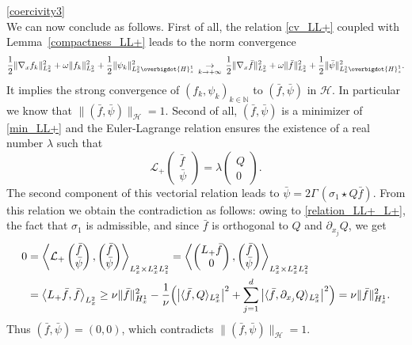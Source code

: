 \begin{ProofOf}{\eqref{coercivity3}}
\begin{equation}
\end{equation}
We can now conclude as follows. First of all, the relation \eqref{cv_LL+} coupled with Lemma~\ref{compactness_LL+} leads to the norm convergence
\[
\frac{1}{2}\|\nabla_{x}f_{k}\|_{L_{x}^{2}}^{2}+\omega\|f_{k}\|_{L_{x}^{2}}^{2}+\frac{1}{2}\|\psi_{k}\|_{L_{x}^{2}\overbigdot{H}_{z}^{1}}^{2}\,\underset{k\to +\infty}{\to}\,\frac{1}{2}\|\nabla_{x}\bar{f}\|_{L_{x}^{2}}^{2}+\omega\|\bar{f}\|_{L_{x}^{2}}^{2}+\frac{1}{2}\|\bar{\psi}\|_{L_{x}^{2}\overbigdot{H}_{z}^{1}}^{2}.
\]
It implies the strong convergence of $(f_{k},\psi_{k})_{k\in\mathbb N}$ to $(\bar{f},\bar{\psi})$ in $\mathscr{H}$. In particular we know that $\|(\bar{f},\bar{\psi})\|_{\mathscr{H}}=1$. Second of all, $(\bar{f},\bar{\psi})$ is a minimizer of \eqref{min_LL+} and the Euler-Lagrange relation ensures the existence of a real number $\lambda$ such that
\[
\mathcal{L}_{+}\begin{pmatrix} \bar{f}\\\bar{\psi} \end{pmatrix}=\lambda\begin{pmatrix} Q\\0 \end{pmatrix}.
\]
The second component of this vectorial relation leads to $\bar{\psi}=2\Gamma\,(\sigma_{1}\star Q\bar{f})$. From this relation we obtain the contradiction as follows: owing to \eqref{relation_LL+_L+}, the fact that $\sigma_1$ is admissible, and since $\bar{f}$ is orthogonal to $Q$ and $\partial_{x_{j}}Q$, we get
\begin{align*}
0&=\left\langle\mathcal{L}_{+}\begin{pmatrix} \bar{f}\\\bar{\psi} \end{pmatrix},\begin{pmatrix} \bar{f}\\\bar{\psi} \end{pmatrix}\right\rangle_{L_{x}^{2}\times L_{x}^{2}L_{z}^{2}}=\left\langle\begin{pmatrix} L_{+}\bar{f}\\0 \end{pmatrix},\begin{pmatrix} \bar{f}\\\bar{\psi} \end{pmatrix}\right\rangle_{L_{x}^{2}\times L_{x}^{2}L_{z}^{2}}\\
&=\left\langle L_{+}\bar{f},\bar{f}\right\rangle_{L_{x}^{2}}\geq\nu\|\bar{f}\|_{H_{x}^{1}}^{2}-\frac{1}{\nu}\Bigl(\left|\langle \bar{f},Q\rangle_{L_{x}^{2}}\right|^{2}+\sum\limits_{j=1}^{d}\left|\langle \bar{f},\partial_{x_{j}}Q\rangle_{L_{x}^{2}}\right|^{2}\Bigr)=\nu\|\bar{f}\|_{H_{x}^{1}}^{2}.
\end{align*}
Thus $(\bar{f},\bar{\psi})=(0,0)$, which contradicts $\|(\bar{f},\bar{\psi})\|_{\mathscr{H}}=1$.
\end{ProofOf}

